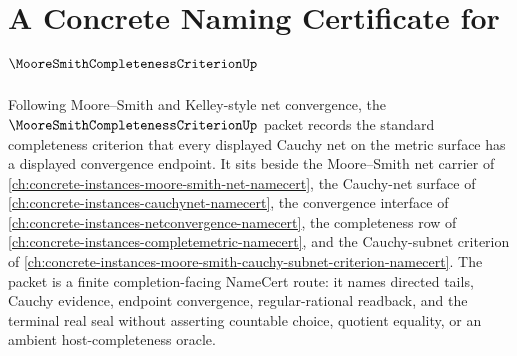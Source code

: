 \chapter{A Concrete Naming Certificate for $\MooreSmithCompletenessCriterionUp$}
\label{ch:concrete-instances-moore-smith-completeness-criterion-namecert}

Following Moore--Smith and Kelley-style net convergence, the $\MooreSmithCompletenessCriterionUp$ packet records the standard completeness criterion that every displayed Cauchy net on the metric surface has a displayed convergence endpoint. It sits beside the Moore--Smith net carrier of \autoref{ch:concrete-instances-moore-smith-net-namecert}, the Cauchy-net surface of \autoref{ch:concrete-instances-cauchynet-namecert}, the convergence interface of \autoref{ch:concrete-instances-netconvergence-namecert}, the completeness row of \autoref{ch:concrete-instances-completemetric-namecert}, and the Cauchy-subnet criterion of \autoref{ch:concrete-instances-moore-smith-cauchy-subnet-criterion-namecert}. The packet is a finite completion-facing NameCert route: it names directed tails, Cauchy evidence, endpoint convergence, regular-rational readback, and the terminal real seal without asserting countable choice, quotient equality, or an ambient host-completeness oracle.

